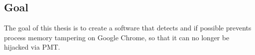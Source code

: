 \subsection{Goal}
The goal of this thesis is to create a software that detects and if possible prevents process memory tampering on Google Chrome, so that it can no longer be hijacked via PMT.
